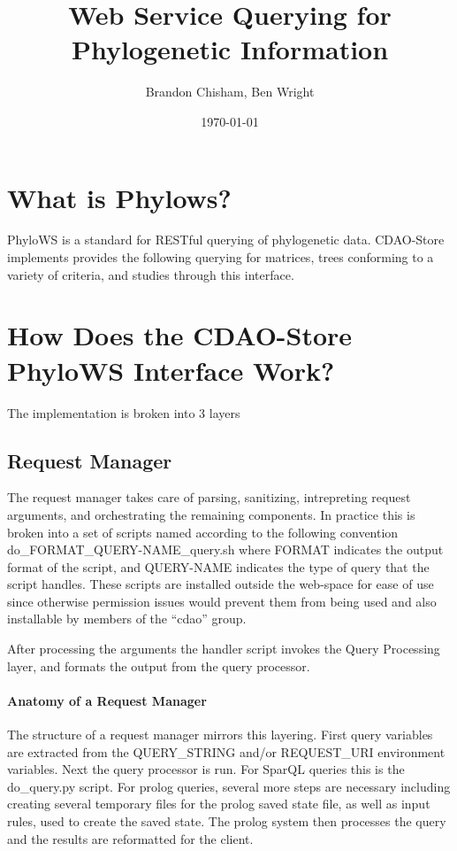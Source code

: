 \documentclass[10pt]{article}
\author{Brandon Chisham, Ben Wright}
\title{Web Service Querying for Phylogenetic Information}
\date{\today}
\begin{document}
\maketitle
\section{What is Phylows?}
PhyloWS is a standard for RESTful querying of phylogenetic data. 
CDAO-Store implements provides the following querying for matrices,
trees conforming to a variety of criteria, and studies through this
interface.

\section{How Does the CDAO-Store PhyloWS Interface Work?}
The implementation is broken into 3 layers
  \subsection{Request Manager}
    The request manager takes care of parsing, sanitizing, intrepreting request arguments, and orchestrating  
   the remaining components. 
     In practice this is broken into a set of scripts named according to the following convention 
     do\_FORMAT\_QUERY-NAME\_query.sh where FORMAT indicates the output format of the script, and QUERY-NAME
     indicates the type of query that the script handles. These scripts are installed outside the web-space for
     ease of use since otherwise permission issues would prevent them from being used and also installable by
     members of the ``cdao'' group.

     After processing the arguments the handler script invokes the Query Processing layer, and formats the output
     from the query processor.

     \paragraph{Anatomy of a Request Manager}
      The structure of a request manager mirrors this layering. First query variables are extracted from the QUERY\_STRING
      and/or REQUEST\_URI environment variables. 
      Next the query processor is run. For SparQL queries this is the do\_query.py script. For prolog queries, several more
      steps are necessary including creating several temporary files for the prolog saved state file, as well as input rules, 
      used to create the saved state. The prolog system then processes the query and the results are reformatted for the client.
\end{document}
